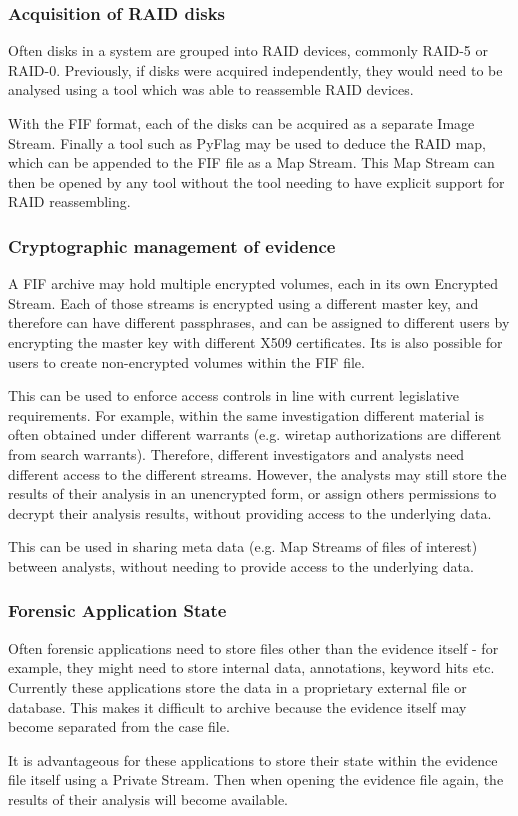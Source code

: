 \documentclass[10pt, conference]{IEEEtran}
\begin{document}
\subsubsection{Acquisition of RAID disks}
Often disks in a system are grouped into RAID devices, commonly RAID-5
or RAID-0. Previously, if disks were acquired independently, they
would need to be analysed using a tool which was able to reassemble
RAID devices.

With the FIF format, each of the disks can be acquired as a separate
Image Stream. Finally a tool such as PyFlag may be used to deduce the
RAID map, which can be appended to the FIF file as a Map Stream. This
Map Stream can then be opened by any tool without the tool needing to
have explicit support for RAID reassembling.

\subsubsection{Cryptographic management of evidence}
A FIF archive may hold multiple encrypted volumes, each in its own
Encrypted Stream. Each of those streams is encrypted using a different
master key, and therefore can have different passphrases, and can be
assigned to different users by encrypting the master key with
different X509 certificates. Its is also possible for users to create
non-encrypted volumes within the FIF file.

This can be used to enforce access controls in line with current
legislative requirements. For example, within the same investigation
different material is often obtained under different warrants
(e.g. wiretap authorizations are different from search
warrants). Therefore, different investigators and analysts need
different access to the different streams. However, the analysts may
still store the results of their analysis in an unencrypted form, or
assign others permissions to decrypt their analysis results, without
providing access to the underlying data. 

This can be used in sharing meta data (e.g. Map Streams of files of
interest) between analysts, without needing to provide access to the
underlying data.

\subsubsection{Forensic Application State}
Often forensic applications need to store files other than the
evidence itself - for example, they might need to store internal data,
annotations, keyword hits etc. Currently these applications store the
data in a proprietary external file or database. This makes it
difficult to archive because the evidence itself may become separated
from the case file.

It is advantageous for these applications to store their state within
the evidence file itself using a Private Stream. Then when opening the
evidence file again, the results of their analysis will become
available.




\end{document}
